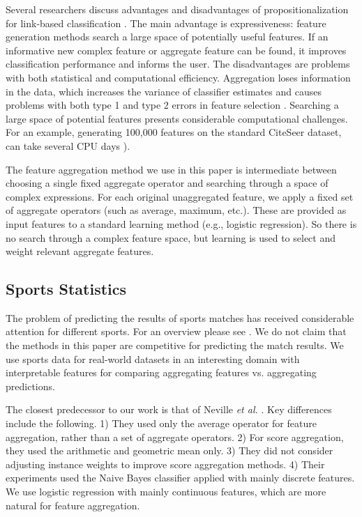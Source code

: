 \documentclass[conference]{IEEEtran}
\begin{document}
Several researchers discuss advantages and disadvantages of  propositionalization for link-based classification \cite{DavidJensen2002,han2009}.
The main advantage is expressiveness: feature generation methods search a large space of potentially useful features. If an informative new complex feature or aggregate feature can be found, it improves classification performance and informs the user. The disadvantages are problems with both statistical and computational efficiency. Aggregation loses information in the data, which increases the variance of classifier estimates and causes problems with both type 1 and type 2 errors in feature selection \cite{Jensen2002a}. Searching a large space of potential features presents considerable computational challenges. For an example, generating 100,000 features on the standard CiteSeer dataset, can take several CPU days
\cite[Ch.16.1.2]{Popescul2007}).

The feature aggregation method we use in this paper is intermediate between choosing a single fixed aggregate operator and searching through a space of complex expressions. For each original unaggregated feature, we apply a fixed set of aggregate operators (such as average, maximum, etc.). These are provided as input features to a standard learning method (e.g., logistic regression). So there is no search through a complex feature space, but learning is used to select and weight relevant aggregate features.



\subsection{Sports Statistics} The problem of predicting the results of sports matches has received considerable attention for different sports. For an overview please see \cite{Schumaker2010}. We do not claim that the methods in this paper are competitive for predicting the match results.
We use sports data for real-world datasets in an interesting domain with interpretable features for comparing aggregating features vs. aggregating predictions.

The closest predecessor to our work is that of Neville {\em et al.} \cite{Neville2003}. Key differences include the following. 1) They used only the average operator for feature aggregation, rather than a set of aggregate operators. 2)  For score aggregation, they used the arithmetic and geometric mean only. 3) They did not consider adjusting instance weights to improve score aggregation methods. 4) Their experiments used the Naive Bayes classifier applied with mainly discrete features. We use logistic regression with mainly continuous features, which are more natural for feature aggregation.
\end{document}
